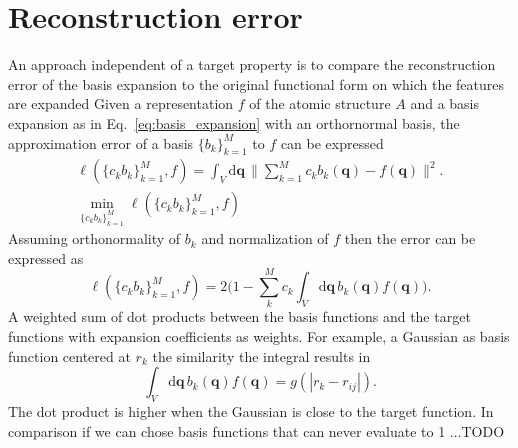 \section{Reconstruction error}
An approach independent of a target property is to compare the reconstruction error of the basis expansion to the
original functional form on which the features are expanded
Given a representation $f$ of the atomic structure $A$ and a basis expansion as in
Eq.~\ref{eq:basis_expansion} with an orthornormal basis, the approximation error
of a basis $\{b_k\}_{k=1}^M$ to $f$ can be expressed
\begin{subequations}
\begin{align}
  \label{eq:information_capacity}
  \ell(\{c_kb_k\}^M_{k=1}, f) = \int_V\mathrm{d}\mathbf{q}\, \|\sum_{k=1}^M c_kb_k(\mathbf{q}) - f(\mathbf{q})\|^2.\\
  \min_{\{c_kb_k\}^M_{k=1}} \ell(\{c_kb_k\}^M_{k=1}, f)
\end{align}
\end{subequations}
Assuming orthonormality of $b_k$ and normalization of $f$ then the error can be expressed as
\begin{equation}
  \label{eq:similarity}
  \ell(\{c_kb_k\}^M_{k=1}, f) = 2\big(1 -\sum_k^M c_k\int_V\mathrm{d}\mathbf{q}\, b_k(\mathbf{q})f(\mathbf{q})\big).
\end{equation}
A weighted sum of dot products between the basis functions and the target functions with expansion coefficients as weights.
For example, a Gaussian as basis function centered at $r_k$ the similarity the integral results in
\begin{equation}
  \int_V\mathrm{d}\mathbf{q}\, b_k(\mathbf{q})f(\mathbf{q}) = g(|r_k-r_{ij}|). %
  \label{eq:gaussian_similarity}
\end{equation}
The dot product is higher when the Gaussian is close to the target function.
In comparison if we can chose basis functions that can never evaluate to 1 ...TODO
